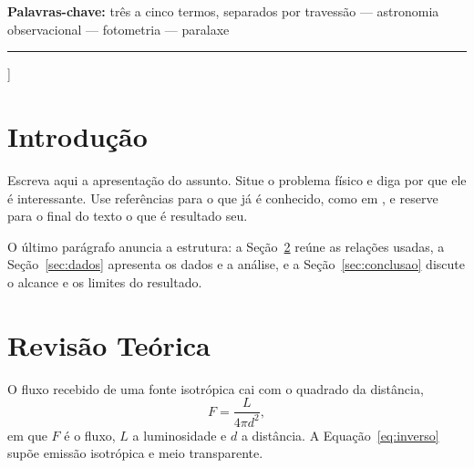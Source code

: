 \documentclass[10pt,a4paper,twocolumn]{article}
\begin{document}
\begin{@twocolumnfalse}
{\vspace{0.6em}
\noindent\textbf{Palavras-chave:} três a cinco termos, separados por
travessão --- astronomia observacional --- fotometria --- paralaxe
}

\vspace{0.5em}
\noindent\rule{\textwidth}{0.3pt}
\vspace{1.4em}

\end{@twocolumnfalse}
]
\thispagestyle{primeira}

\section{Introdução}

Escreva aqui a apresentação do assunto. Situe o problema físico e diga por
que ele é interessante. Use referências para o que já é conhecido, como em
\cite{carroll}, e reserve para o final do texto o que é resultado seu.

O último parágrafo anuncia a estrutura: a Seção~\ref{sec:teoria} reúne as
relações usadas, a Seção~\ref{sec:dados} apresenta os dados e a análise, e
a Seção~\ref{sec:conclusao} discute o alcance e os limites do resultado.

\section{Revisão Teórica}
\label{sec:teoria}

O fluxo recebido de uma fonte isotrópica cai com o quadrado da distância,
\begin{equation}
    F = \frac{L}{4\pi d^{2}},
    \label{eq:inverso}
\end{equation}
em que $F$ é o fluxo, $L$ a luminosidade e $d$ a distância. A
Equação~\eqref{eq:inverso} supõe emissão isotrópica e meio transparente.
\end{document}
